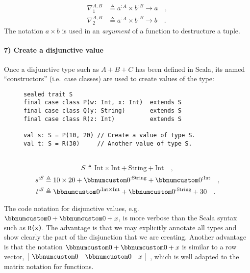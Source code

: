 ~\vspace{-1\baselineskip}
\begin{align*}
\nabla_{1}^{A,B} & \triangleq a^{:A}\times b^{:B}\rightarrow a\quad,\\
\nabla_{2}^{A,B} & \triangleq a^{:A}\times b^{:B}\rightarrow b\quad.
\end{align*}
The notation $a\times b$ is used in an \emph{argument} of a function
to destructure a tuple.

\paragraph{7) Create a disjunctive value}

Once a disjunctive type such as $A+B+C$ has been defined in Scala,
its named \textsf{``}constructors\textsf{''} (i.e.~case classes) are used to create
values of the type:

\begin{wrapfigure}{l}{0.5\columnwidth}%
\vspace{-0.75\baselineskip}
\begin{lstlisting}
sealed trait S
final case class P(w: Int, x: Int)  extends S
final case class Q(y: String)       extends S
final case class R(z: Int)          extends S

val s: S = P(10, 20) // Create a value of type S.
val t: S = R(30)     // Another value of type S.
\end{lstlisting}

\vspace{-0\baselineskip}
\end{wrapfigure}%

~\vspace{0.35\baselineskip}
\[
S\triangleq\text{Int}\times\text{Int}+\text{String}+\text{Int}\quad,
\]
\begin{align*}
s^{:S} & \triangleq10\times20+\bbnum 0^{:\text{String}}+\bbnum 0^{:\text{Int}}\quad,\\
t^{:S} & \triangleq\bbnum 0^{:\text{Int}\times\text{Int}}+\bbnum 0^{:\text{String}}+30\quad.
\end{align*}
\vspace{-0.9\baselineskip}

The code notation for disjunctive values, e.g.~$\bbnum 0+\bbnum 0+x$,
is more verbose than the Scala syntax such as \lstinline!R(x)!. The
advantage is that we may explicitly annotate all types and show clearly
the part of the disjunction that we are creating. Another advantage
is that the notation $\bbnum 0+\bbnum 0+x$ is similar to a row vector,
$\,\begin{array}{|ccc|}
\bbnum 0 & \bbnum 0 & x\end{array}$~, which is well adapted to the matrix notation for functions.

